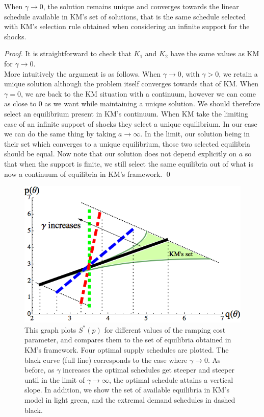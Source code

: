 \begin{proposition}
When $\gamma\to0$, the solution remains unique and converges towards the linear schedule available in KM's set of solutions, that is the same schedule selected with KM's selection rule obtained when considering an infinite support for the shocks.
\end{proposition}
\begin{proof}
It is straightforward to check that $K_1$ and $K_2$ have the same values as KM for $\gamma\to0$. \\
More intuitively the argument is as follows. When $\gamma\to 0$, with $\gamma>0$, we retain a unique solution although the problem itself converges towards that of KM. When $\gamma = 0$, we are back to the KM situation with a continuum, however we can come as close to 0 as we want while maintaining a unique solution. We should therefore select an equilibrium present in KM's continuum. When KM take the limiting case of an infinite support of shocks they select a unique equilibrium. In our case we can do the same thing by taking $a\to\infty$. In the limit, our solution being in their set which converges to a unique equilibrium, those two selected equilibria should be equal. Now note that our solution does not depend explicitly on $a$ so that when the support is finite, we still select the same equilibria out of what is now a continuum of equilibria in KM's framework.             \qed
\end{proof}


\begin{figure}[h] 
\centering
\includegraphics[width=12cm]{figch1/oligovraiKMd.png}
\caption{\small{This graph plots $S^*(p)$ for different values of the ramping cost parameter, and compares them to the set of equilibria obtained in KM's framework. Four optimal supply schedules are plotted. The black curve (full line) corresponds to the case where $\gamma\to0$. As before, as $\gamma$ increases the optimal schedules get steeper and steeper until in the limit of $\gamma\to\infty$, the optimal schedule attains a vertical slope. In addition, we show the set of available equilibria in KM's model in light green, and the extremal demand schedules in dashed black.  }} \label{fig:oligop}
\end{figure}

